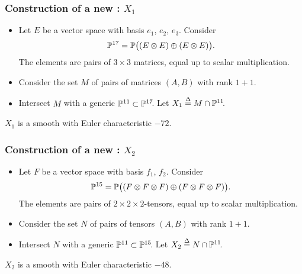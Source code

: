 \begin{frame}
    \frametitle{Construction of a new \CY: $X_1$}

\pause

    \begin{itemize}
	    \item
        Let $E$ be a vector space with basis $e_1$, $e_2$, $e_3$. Consider
        \[
            \P^{17} = \P\big((E \otimes E) \oplus (E \otimes E) \big).
        \]
        The elements are pairs of $3 \times 3$ matrices, equal up to scalar multiplication.
        \pause

        \item
        Consider the set $M$ of pairs of matrices $(A, B)$ with rank $1 + 1$.
        \pause

        \item
        Intersect $M$ with a generic $\P^{11} \subset \P^{17}\mkern-4mu$. Let $X_1 \defeq M \cap \P^{11}\mkern-4mu$.
        \pause
    \end{itemize}

    \begin{theorem}
        $X_1$ is a smooth \CY with Euler characteristic $-72$.
    \end{theorem}
\end{frame}


\begin{frame}
    \frametitle{Construction of a new \CY: $X_2$}

    \begin{itemize}
    	\item Let $F$ be a vector space with basis $f_1$, $f_2$. Consider
	    \[
            \P^{15} = \P\big((F \otimes F \otimes F) \oplus (F \otimes F \otimes F)\big).
	    \]
	    The elements are pairs of $2 \times 2 \times 2$-tensors, equal up to scalar multiplication.

	    \item
	    Consider the set $N$ of pairs of tensors $(A, B)$ with rank $1 + 1$.

	    \item
	    Intersect $N$ with a generic $\P^{11} \subset \P^{15}\mkern-4mu$. Let $X_2 \defeq N \cap \P^{11}\mkern-4mu$.
    \end{itemize}

    \begin{theorem}
        $X_2$ is a smooth \CY with Euler characteristic $-48$.
    \end{theorem}
\end{frame}

